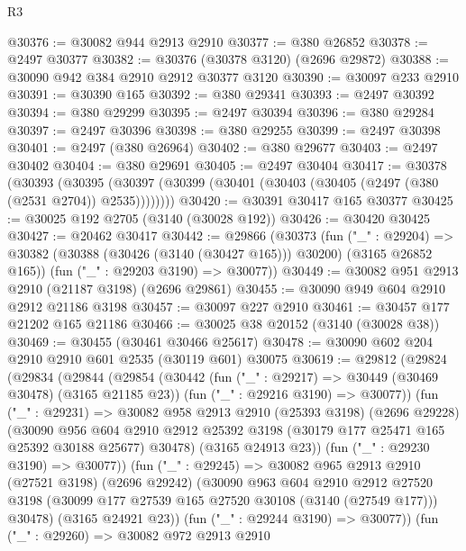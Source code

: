 \begin{lexlean}{R3}
\begin{coremodule}
@30376 := @30082 @944 @2913 @2910
@30377 := @380 @26852
@30378 := @2497 @30377
@30382 := @30376 (@30378 @3120) (@2696 @29872)
@30388 := @30090 @942 @384 @2910 @2912 @30377 @3120
@30390 := @30097 @233 @2910
@30391 := @30390 @165
@30392 := @380 @29341
@30393 := @2497 @30392
@30394 := @380 @29299
@30395 := @2497 @30394
@30396 := @380 @29284
@30397 := @2497 @30396
@30398 := @380 @29255
@30399 := @2497 @30398
@30401 := @2497 (@380 @26964)
@30402 := @380 @29677
@30403 := @2497 @30402
@30404 := @380 @29691
@30405 := @2497 @30404
@30417 := @30378
    (@30393
      (@30395 (@30397 (@30399 (@30401 (@30403 (@30405 (@2497 (@380 (@2531 @2704)) @2535))))))))
@30420 := @30391 @30417 @165 @30377
@30425 := @30025 @192 @2705 (@3140 (@30028 @192))
@30426 := @30420 @30425
@30427 := @20462 @30417
@30442 := @29866
    (@30373
      (fun ("_" : @29204) =>
      @30382 (@30388 (@30426 (@3140 (@30427 @165))) @30200) (@3165 @26852 @165))
      (fun ("_" : @29203 @3190) => @30077))
@30449 := @30082 @951 @2913 @2910 (@21187 @3198) (@2696 @29861)
@30455 := @30090 @949 @604 @2910 @2912 @21186 @3198
@30457 := @30097 @227 @2910
@30461 := @30457 @177 @21202 @165 @21186
@30466 := @30025 @38 @20152 (@3140 (@30028 @38))
@30469 := @30455 (@30461 @30466 @25617)
@30478 := @30090 @602 @204 @2910 @2910 @601 @2535 (@30119 @601) @30075
@30619 := @29812
    (@29824
      (@29834
        (@29844
          (@29854
            (@30442
              (fun ("_" : @29217) => @30449 (@30469 @30478) (@3165 @21185 @23))
              (fun ("_" : @29216 @3190) => @30077))
            (fun ("_" : @29231) =>
            @30082
              @958
              @2913
              @2910
              (@25393 @3198)
              (@2696 @29228)
              (@30090
                @956
                @604
                @2910
                @2912
                @25392
                @3198
                (@30179 @177 @25471 @165 @25392 @30188 @25677)
                @30478)
              (@3165 @24913 @23))
            (fun ("_" : @29230 @3190) => @30077))
          (fun ("_" : @29245) =>
          @30082
            @965
            @2913
            @2910
            (@27521 @3198)
            (@2696 @29242)
            (@30090
              @963
              @604
              @2910
              @2912
              @27520
              @3198
              (@30099 @177 @27539 @165 @27520 @30108 (@3140 (@27549 @177)))
              @30478)
            (@3165 @24921 @23))
          (fun ("_" : @29244 @3190) => @30077))
        (fun ("_" : @29260) =>
        @30082
          @972
          @2913
          @2910

\end{coremodule}
\end{lexlean}
